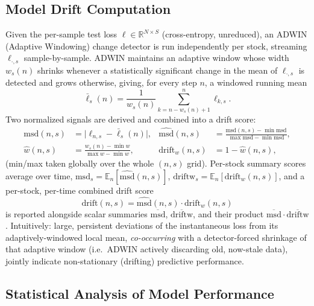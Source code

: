 \documentclass[stu,floatsintext]{apa7}
\newcommand{\R}{\mathbb{R}}
\begin{document}
\subsection{Model Drift Computation}

Given the per-sample test loss $\ell\in\R^{N\times S}$ (cross-entropy, unreduced), an ADWIN
(Adaptive Windowing) change detector is run independently per stock, streaming $\ell_{\cdot,s}$
sample-by-sample. ADWIN maintains an adaptive window whose width $w_s(n)$ shrinks whenever a
statistically significant change in the mean of $\ell_{\cdot,s}$ is detected and grows otherwise, giving,
for every step $n$, a windowed running mean
\begin{equation}
  \bar\ell_s(n) = \frac{1}{w_s(n)}\sum_{k=n-w_s(n)+1}^{n} \ell_{k,s}.
\end{equation}
Two normalized signals are derived and combined into a drift score:
\begin{align}
  \mathrm{msd}(n,s) &= \bigl|\ell_{n,s} - \bar\ell_s(n)\bigr|, &
  \widehat{\mathrm{msd}}(n,s) &= \frac{\mathrm{msd}(n,s)-\min \mathrm{msd}}{\max \mathrm{msd}-\min \mathrm{msd}}, \\
  \widehat{w}(n,s) &= \frac{w_s(n)-\min w}{\max w-\min w}, &
  \mathrm{drift}_w(n,s) &= 1-\widehat{w}(n,s),
\end{align}
(min/max taken globally over the whole $(n,s)$ grid). Per-stock summary scores average over time,
$\mathrm{msd}_s=\mathbb E_n[\widehat{\mathrm{msd}}(n,s)]$, $\mathrm{driftw}_s=\mathbb E_n[\mathrm{drift}_w(n,s)]$, and a
per-stock, per-time combined drift score
\begin{equation}
  \mathrm{drift}(n,s) = \widehat{\mathrm{msd}}(n,s)\cdot \mathrm{drift}_w(n,s)
\end{equation}
is reported alongside scalar summaries $\overline{\mathrm{msd}}$, $\overline{\mathrm{driftw}}$, and their
product $\overline{\mathrm{msd}}\cdot\overline{\mathrm{driftw}}$. Intuitively: large, persistent deviations
of the instantaneous loss from its adaptively-windowed local mean, \emph{co-occurring} with a
detector-forced shrinkage of that adaptive window (i.e.\ ADWIN actively discarding old, now-stale data),
jointly indicate non-stationary (drifting) predictive performance.

\subsection{Statistical Analysis of Model Performance}
\label{sec:analyze}
\end{document}
